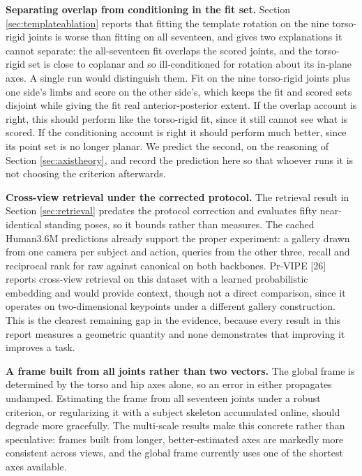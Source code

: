 \documentclass[12pt,a4paper]{report}
\begin{document}
\noindent \textbf{Separating overlap from conditioning in the fit set.} Section \ref{sec:templateablation} reports that fitting the template rotation on the nine torso-rigid joints is worse than fitting on all seventeen, and gives two explanations it cannot separate: the all-seventeen fit overlaps the scored joints, and the torso-rigid set is close to coplanar and so ill-conditioned for rotation about its in-plane axes. A single run would distinguish them. Fit on the nine torso-rigid joints plus one side's limbs and score on the other side's, which keeps the fit and scored sets disjoint while giving the fit real anterior-posterior extent. If the overlap account is right, this should perform like the torso-rigid fit, since it still cannot see what is scored. If the conditioning account is right it should perform much better, since its point set is no longer planar. We predict the second, on the reasoning of Section \ref{sec:axistheory}, and record the prediction here so that whoever runs it is not choosing the criterion afterwards.

\noindent \textbf{Cross-view retrieval under the corrected protocol.} The retrieval result in Section \ref{sec:retrieval} predates the protocol correction and evaluates fifty near-identical standing poses, so it bounds rather than measures. The cached Human3.6M predictions already support the proper experiment: a gallery drawn from one camera per subject and action, queries from the other three, recall and reciprocal rank for raw against canonical on both backbones. Pr-VIPE [26] reports cross-view retrieval on this dataset with a learned probabilistic embedding and would provide context, though not a direct comparison, since it operates on two-dimensional keypoints under a different gallery construction. This is the clearest remaining gap in the evidence, because every result in this report measures a geometric quantity and none demonstrates that improving it improves a task.

\noindent \textbf{A frame built from all joints rather than two vectors.} The global frame is determined by the torso and hip axes alone, so an error in either propagates undamped. Estimating the frame from all seventeen joints under a robust criterion, or regularizing it with a subject skeleton accumulated online, should degrade more gracefully. The multi-scale results make this concrete rather than speculative: frames built from longer, better-estimated axes are markedly more consistent across views, and the global frame currently uses one of the shortest axes available.
\end{document}

